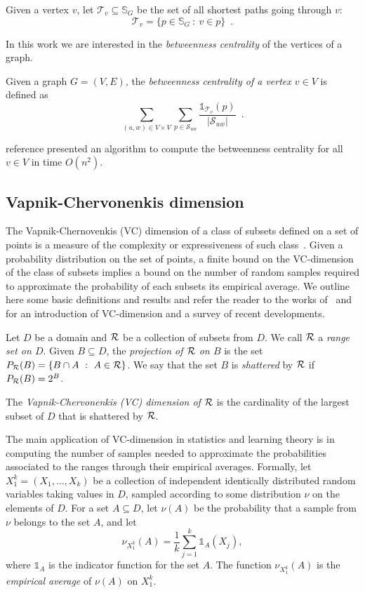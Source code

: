 Given a vertex $v$, let $\mathcal{T}_v\subseteq\mathbb{S}_G$ be the set of all
shortest paths going through $v$:
\[
\mathcal{T}_v=\{p\in\mathbb{S}_G ~:~ v\in p\}\enspace.
\]

In this work we are interested in the \emph{betweenness centrality} of the
vertices of a graph.
\begin{definition}\label{def:betwenness}
  Given a graph $G=(V,E)$, the \emph{betweenness centrality of a vertex $v\in
  V$} is defined as
  \[
  \sum_{(u,w)\in V\times
  V}\sum_{p\in\mathcal{S}_{uw}}\frac{\mathds{1}_{\mathcal{T}_v}(p)}{|\mathcal{S}_{uw}|}\enspace.
  \]
\end{definition} 

\XXX reference \MR presented an algorithm to compute the betweenness centrality for
all $v\in V$ in time $O(n^2)$. 

\subsection{Vapnik-Chervonenkis dimension}\label{sec:prelvcdim}
The Vapnik-Chernovenkis (VC) dimension of a class of subsets defined
on a set of points is a measure of the complexity or expressiveness of such
class~\citep{VapnikC71}. Given a probability distribution on the set of points,
a finite bound on the VC-dimension of the class of subsets implies a bound on
the number of random samples required to approximate the probability of each
subsets its empirical average. We outline here some basic definitions and
results and refer the reader to the works of~\citet[Sect.~14.4]{AlonS08} and
\citet[Sect.~3]{BoucheronBL05} for an introduction of VC-dimension and a survey
of recent developments. 

Let $D$ be a domain and $\mathcal{R}$ be a collection of subsets from $D$. We call
$\mathcal{R}$ a \emph{range set on $D$}.
Given $B\subseteq D$, the \emph{projection of $\mathcal{R}$ on $B$} is the set 
$P_{\mathcal{R}}(B)=\{ B\cap A ~:~ A\in\mathcal{R}\}$. We say that the set $B$ is
\emph{shattered} by $\mathcal{R}$ if $P_{\mathcal{R}}(B)=2^B$.

\begin{definition}\label{def:vcdim}
  The \emph{Vapnik-Chervonenkis (VC) dimension of $\mathcal{R}$} is the cardinality
  of the largest subset of $D$ that is shattered by $\mathcal{R}$.
\end{definition}

The main application of VC-dimension in statistics and learning
theory is in computing the number of samples needed to approximate the
probabilities associated to the ranges through their empirical averages.
Formally, let $X_1^k=(X_1,\dotsc,X_k)$ be a collection of independent
identically distributed random variables taking values in $D$, sampled 
according to some distribution $\nu$ on the elements of $D$.
For a set $A\subseteq D$, let $\nu(A)$ be the probability that a sample from
$\nu$ belongs to the set $A$, and let
\[
\nu_{X_1^k}(A)=\frac{1}{k}\sum_{j=1}^k\mathds{1}_A(X_j),\]
where $\mathds{1}_A$ is the indicator function for the set $A$. The function
$\nu_{X_1^k}(A)$ is the \emph{empirical average} of $\nu(A)$ on $X_1^k$.

